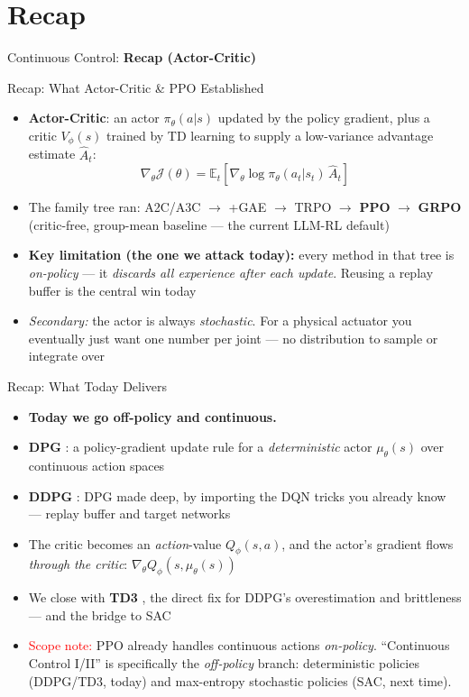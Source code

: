 \section{Recap}
\begin{frame}{}
    \LARGE Continuous Control: \textbf{Recap (Actor-Critic)}
\end{frame}

\begin{frame}{Recap: What Actor-Critic \& PPO Established}
\begin{itemize}
    \item \textbf{Actor-Critic}: an actor $\pi_\theta(a|s)$ updated by the policy gradient, plus a critic $V_\phi(s)$ trained by TD learning to supply a low-variance advantage estimate $\hat{A}_t$:
    $$\nabla_\theta \mathcal{J}(\theta) = \mathbb{E}_t\!\left[ \nabla_\theta \log \pi_\theta(a_t|s_t)\, \hat{A}_t \right]$$
    \item The family tree ran: A2C/A3C $\rightarrow$ +GAE $\rightarrow$ TRPO $\rightarrow$ \textbf{PPO} $\rightarrow$ \textbf{GRPO} (critic-free, group-mean baseline --- the current LLM-RL default)
    \item \textbf{Key limitation (the one we attack today):} every method in that tree is \emph{on-policy} --- it \emph{discards all experience after each update}. Reusing a replay buffer is the central win today
    \item \emph{Secondary:} the actor is always \emph{stochastic}. For a physical actuator you eventually just want one number per joint --- no distribution to sample or integrate over
\end{itemize}
\end{frame}

\begin{frame}{Recap: What Today Delivers}
\begin{itemize}
    \item \textbf{Today we go off-policy and continuous.}
    \item \textbf{DPG} : a policy-gradient update rule for a \emph{deterministic} actor $\mu_\theta(s)$ over continuous action spaces
    \item \textbf{DDPG} : DPG made deep, by importing the DQN  tricks you already know --- replay buffer and target networks
    \item The critic becomes an \emph{action}-value $Q_\phi(s,a)$, and the actor's gradient flows \emph{through the critic}: $\nabla_\theta Q_\phi(s, \mu_\theta(s))$
    \item We close with \textbf{TD3} , the direct fix for DDPG's overestimation and brittleness --- and the bridge to SAC
    \vspace{0.4em}
    \item[] \footnotesize \textcolor{red}{Scope note:} PPO already handles continuous actions \emph{on-policy}. ``Continuous Control I/II'' is specifically the \emph{off-policy} branch: deterministic policies (DDPG/TD3, today) and max-entropy stochastic policies (SAC, next time).
\end{itemize}
\end{frame}

